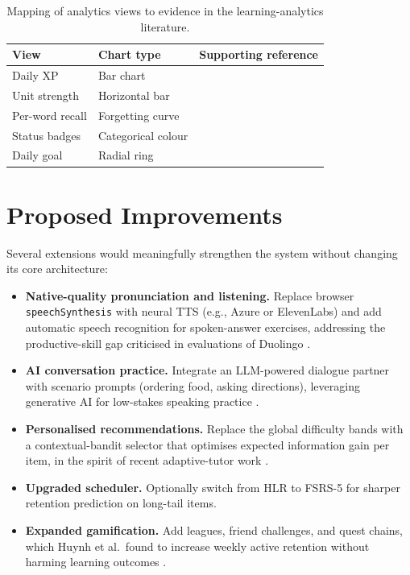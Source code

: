 \documentclass[11pt,a4paper]{article}
\begin{document}
\begin{table}[H]
\centering
\caption{Mapping of analytics views to evidence in the learning-analytics literature.}
\label{tab:analytics-map}
\begin{tabular}{lll}
\toprule
\textbf{View} & \textbf{Chart type} & \textbf{Supporting reference} \\
\midrule
Daily XP & Bar chart & \cite{few2006information} \\
Unit strength & Horizontal bar & \cite{bull2010open} \\
Per-word recall & Forgetting curve & \cite{ebbinghaus1885memory,settles2016trainable} \\
Status badges & Categorical colour & \cite{schwendimann2017perceiving} \\
Daily goal & Radial ring & \cite{verbert2014learning} \\
\bottomrule
\end{tabular}
\end{table}

\section{Proposed Improvements}
Several extensions would meaningfully strengthen the system without changing its core architecture:

\begin{itemize}[leftmargin=*]
  \item \textbf{Native-quality pronunciation and listening.} Replace browser \texttt{speechSynthesis} with neural TTS (e.g., Azure or ElevenLabs) and add automatic speech recognition for spoken-answer exercises, addressing the productive-skill gap criticised in evaluations of Duolingo \cite{loewen2019duolingo}.
  \item \textbf{AI conversation practice.} Integrate an LLM-powered dialogue partner with scenario prompts (ordering food, asking directions), leveraging generative AI for low-stakes speaking practice \cite{kohnke2023chatgpt}.
  \item \textbf{Personalised recommendations.} Replace the global difficulty bands with a contextual-bandit selector that optimises expected information gain per item, in the spirit of recent adaptive-tutor work \cite{whitehill2017thompson}.
  \item \textbf{Upgraded scheduler.} Optionally switch from HLR to FSRS-5 \cite{su2023fsrs} for sharper retention prediction on long-tail items.
  \item \textbf{Expanded gamification.} Add leagues, friend challenges, and quest chains, which Huynh et al.\ found to increase weekly active retention without harming learning outcomes \cite{huynh2017gamification}.
\end{itemize}
\end{document}
